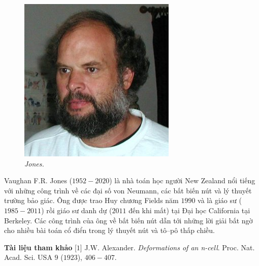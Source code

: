 \begin{multicols}{2}
		\vspace*{-8pt}
		\begin{tBox}
				\begin{figure}
						\vspace*{-15pt}
						\centering
						\captionsetup{labelformat= empty, justification=centering}
						\hspace*{-10pt}\includegraphics[width= 1.1\linewidth]{fig_Jones}
						\caption{\small\textit{\color{duongvaotoanhoc}Jones.}}
						\vspace*{-15pt}
					\end{figure}
				Vaughan F.R. Jones ($1952-2020$) là nhà toán học người New Zealand nổi tiếng với những công trình về các đại số von Neumann, các bất biến nút và lý thuyết trường bảo giác. Ông được trao Huy chương Fields năm $1990$ và là giáo sư ($1985-2011$) rồi giáo sư danh dự ($2011$ đến khi mất) tại Đại học California tại Berkeley. Các công trình của ông về bất biến nút dẫn tới những lời giải bất ngờ cho nhiều bài toán cổ điển trong lý thuyết nút và tô--pô thấp chiều.
			\end{tBox}
	\textbf{\color{duongvaotoanhoc}Tài liệu tham khảo}
	\vskip 0.1cm
	{\small[$1$] J.W. Alexander. \textit{Deformations of an n-cell}. Proc. Nat. Acad. Sci. USA $9$ ($1923$), $406-407$.
}
\end{multicols}

